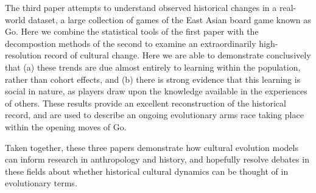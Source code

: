 The third paper attempts to understand observed historical changes in a real-world dataset, a large collection of games of the East Asian board game known as Go.  Here we combine the statistical tools of the first paper with the decompostion methods of the second to examine an extraordinarily high-resolution record of cultural change.  Here we are able to demonstrate conclusively that (a) these trends are due almost entirely to learning within the population, rather than cohort effects, and (b) there is strong evidence that this learning is social in nature, as players draw upon the knowledge available in the experiences of others.  These results provide an excellent reconstruction of the historical record, and are used to describe an ongoing evolutionary arms race taking place within the opening moves of Go.  

Taken together, these three papers demonstrate how cultural evolution models can inform research in anthropology and history, and hopefully resolve debates in these fields about whether historical cultural dynamics can be thought of in evolutionary terms.  
